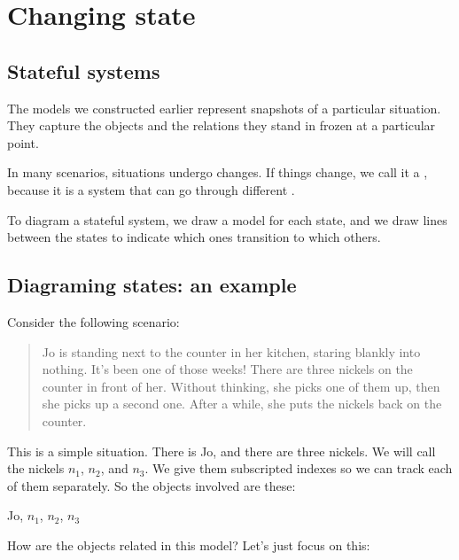 \documentclass[../../../main.tex]{subfiles}
\begin{document}
\chapter{Changing state}


\section{Stateful systems}

The models we constructed earlier represent snapshots of a particular situation. They capture the objects and the relations they stand in frozen at a particular point.

In many scenarios, situations undergo changes. If things change, we call it a , because it is a system that can go through different .

To diagram a stateful system, we draw a model for each state, and we draw lines between the states to indicate which ones transition to which others.


\section{Diagraming states: an example}

Consider the following scenario:

\begin{quote}
  Jo is standing next to the counter in her kitchen, staring blankly into nothing. It's been one of those weeks! There are three nickels on the counter in front of her. Without thinking, she picks one of them up, then she picks up a second one. After a while, she puts the nickels back on the counter.
\end{quote}

\noindent
This is a simple situation. There is Jo, and there are three nickels. We will call the nickels $n_{1}$, $n_{2}$, and $n_{3}$. We give them subscripted indexes so we can track each of them separately. So the objects involved are these:

\begin{center}
  Jo, $n_{1}$, $n_{2}$, $n_{3}$
\end{center}

\noindent
How are the objects related in this model? Let's just focus on this: 
\end{document}

